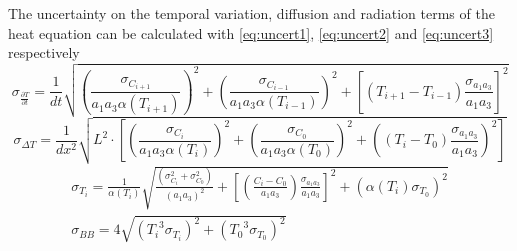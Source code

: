 The uncertainty on the temporal variation, diffusion and radiation terms of the heat equation can be calculated with \autoref{eq:uncert1}, \ref{eq:uncert2} and \ref{eq:uncert3} respectively
\begin{equation}
{\sigma }_{ \frac {\partial T} {\partial t}} = \frac 1 {dt}  \sqrt{ \left ( \frac {{\sigma }_{C_{i+1}}} { a_1 a_3 \alpha(T_{i+1}) } \right )^2 + \left ( \frac {{\sigma }_{C_{i-1}}} { a_1 a_3 \alpha(T_{i-1}) } \right )^2 + \left [ \left ( T_{i+1}-T_{i-1} \right ) \frac {{\sigma }_{a_1 a_3}} {a_1 a_3} \right ]^2 } 
\label{eq:uncert1}
\end{equation}
\begin{equation}
{\sigma }_{ \Delta T} = \frac {1} {dx^2} \sqrt{ L^2 \cdot \left[  \left(  \frac {{\sigma }_{C_i}} { a_1 a_3 \alpha(T_i) } \right)^2 + \left( \frac {{\sigma }_{C_0}} { a_1 a_3 \alpha(T_0) } \right)^2 + \left( ({T_i -T_0}) \frac {{\sigma }_{a_1 a_3}} {a_1 a_3} \right)^2 \right] } 
\label{eq:uncert2}
\end{equation}\begin{equation}
\begin{split}
{\sigma }_{T_i} = \frac 1 {\alpha(T_i)} \sqrt{ \frac {({\sigma }_{C_i}^2 + {\sigma }_{C_0}^2 )} { (a_1 a_3)^2 } + \left [ \left (\frac {C_i -C_0} {a_1 a_3} \right ) \frac {{\sigma }_{a_1 a_3}} {a_1 a_3} \right ]^2  + (\alpha(T_i) {\sigma }_{T_0})^2 } \\ {\sigma }_{ BB} = 4 \sqrt{ ({T_i}^3 {\sigma }_{T_i})^2 + ({T_0}^3 {\sigma }_{T_0})^2 }
\label{eq:uncert3}
\end{split}
\end{equation}


